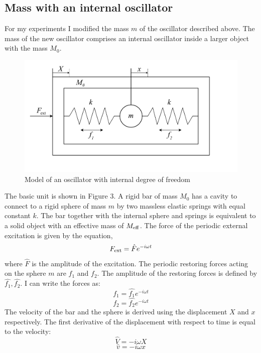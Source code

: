 \documentclass[12pt]{article}
\begin{document}
\subsection{Mass with an internal oscillator}
For my experiments I modified the mass $m$ of the oscillator described above. The mass of the new oscillator comprises an internal oscillator inside a larger object with the mass $M_{0}$.
\begin{figure}[hbt]
  \includegraphics[width=0.7\columnwidth]{fundamentals/oscillator_with_internal_degree_of_freedom.pdf}
  \caption{Model of an oscillator with internal degree of freedom}
\end{figure}
The basic unit is shown in Figure 3. A rigid bar of mass $M_0$ has a cavity to connect to a rigid sphere of mass $m$ by two massless elastic springs with equal constant $k$. The bar together with the internal sphere and springs is equivalent to a solid object with an effective mass of $M_{\rm eff}$. The force of the periodic external excitation is given by the equation, 
\begin{equation}\label{eq:8}
	F_{\rm ext} = \hat{F} e^{-i\omega t}
\end{equation}
where $\hat{F}$ is the amplitude of the excitation. The periodic restoring forces acting on the sphere $m$ are $f_1$ and $f_2$. The amplitude of the restoring forces is defined by $\hat{f_1},\hat{f_2}$. I can write the forces as:
\begin{equation}\label{eq:9}
	f_1 = \hat{f_1} e^{-i\omega t}	
\end{equation}
\begin{equation}\label{eq:10}
	f_2 = \hat{f_2} e^{-i\omega t}	
\end{equation}
The velocity of the bar and the sphere is derived using the displacement $X$ and $x$ respectively. The first derivative of the displacement with respect to time is equal to the velocity: 
\begin{equation}\label{eq:11}
	\hat{V} = -i\omega X	
\end{equation}
\begin{equation}\label{eq:12}
	\hat{v} = -i\omega x
\end{equation}
\end{document}
